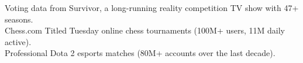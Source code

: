 \documentclass[preview]{standalone}
\begin{document}
Voting data from Survivor, a long-running reality competition TV show with 47+ seasons.\\Chess.com Titled Tuesday online chess tournaments (100M+ users, 11M daily active).\\Professional Dota 2 esports matches (80M+ accounts over the last decade).\\
\end{document}
